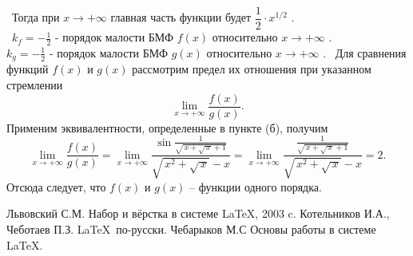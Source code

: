 \documentclass[12pt]{article}
\begin{document}
\text{\bf}~Тогда при $x\rightarrow+\infty$ главная часть функции будет $\dfrac{1}{2}\cdot x^{1/2}$ . \\
\text{\bf}~$k_f = -\frac{1}{2}$ - порядок малости БМФ $f(x)$ относительно $x\rightarrow+\infty$ . \\
$k_g = -\frac{1}{2}$ - порядок малости БМФ $g(x)$ относительно $x\rightarrow+\infty$ .
\newpage
{}~Для сравнения функций $f(x)$ и $g(x)$ рассмотрим предел их отношения при указанном стремлении
$$
\lim\limits_{x\rightarrow+\infty}\dfrac{f(x)}{g(x)}.
$$
Применим эквивалентности, определенные в пункте (б), получим
$$
\lim\limits_{x\rightarrow+\infty}\dfrac{f(x)}{g(x)} = 
\lim\limits_{x\rightarrow+\infty}\dfrac{\sin{\frac{1}{\sqrt{\,x+\sqrt{\,x}+1}}}}{\sqrt{\,x^2+\sqrt{\,x}}-x} =
\lim\limits_{x\rightarrow+\infty}\dfrac{\frac{1}{\sqrt{\,x+\sqrt{\,x}+1}}}{\sqrt{\,x^2+\sqrt{\,x}}-x} = 2 .
$$
Отсюда следует, что $f(x)$ и $g(x)$ -- функции одного порядка.
\newpage
{}
\begin{thebibliography}{99}
 Львовский С.М. Набор и вёрстка в системе \LaTeX, 2003 c.
 Котельников И.А., Чеботаев П.З. \LaTeX~по-русски.
 Чебарыков М.С Основы работы в системе \LaTeX.
\end{thebibliography}
\end{document}
